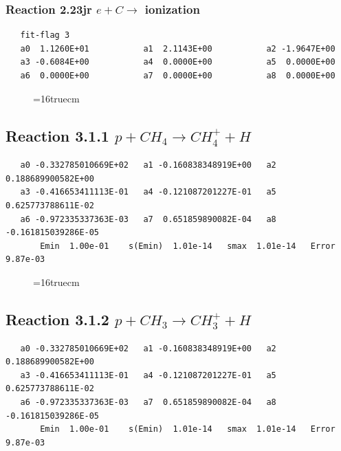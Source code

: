 \documentclass[12pt,dvipdfmx]{article}
\begin{document}
\subsubsection{
Reaction 2.23jr    $e + C \rightarrow$ ionization
}

\begin{small}\begin{verbatim}
   fit-flag 3
   a0  1.1260E+01           a1  2.1143E+00           a2 -1.9647E+00
   a3 -0.6084E+00           a4  0.0000E+00           a5  0.0000E+00
   a6  0.0000E+00           a7  0.0000E+00           a8  0.0000E+00
\end{verbatim}\end{small}


\begin{figure} \label{met.1_2.23}
\epsfxsize=16truecm
\end{figure}
\newpage

\subsection{
Reaction 3.1.1    $p + CH_4 \rightarrow CH_4^+ + H $
}

\begin{small}\begin{verbatim}
   a0 -0.332785010669E+02   a1 -0.160838348919E+00   a2  0.188689900582E+00
   a3 -0.416653411113E-01   a4 -0.121087201227E-01   a5  0.625773788611E-02
   a6 -0.972335337363E-03   a7  0.651859890082E-04   a8 -0.161815039286E-05
       Emin  1.00e-01    s(Emin)  1.01e-14   smax  1.01e-14   Error  9.87e-03
\end{verbatim}\end{small}

\begin{figure} \label{met.1_3.1.1}
\epsfxsize=16truecm
\end{figure}
\newpage


\subsection{
Reaction 3.1.2    $p + CH_3 \rightarrow CH_3^+ + H $
}

\begin{small}\begin{verbatim}
   a0 -0.332785010669E+02   a1 -0.160838348919E+00   a2  0.188689900582E+00
   a3 -0.416653411113E-01   a4 -0.121087201227E-01   a5  0.625773788611E-02
   a6 -0.972335337363E-03   a7  0.651859890082E-04   a8 -0.161815039286E-05
       Emin  1.00e-01    s(Emin)  1.01e-14   smax  1.01e-14   Error  9.87e-03
 \end{verbatim}\end{small}
\end{document}
